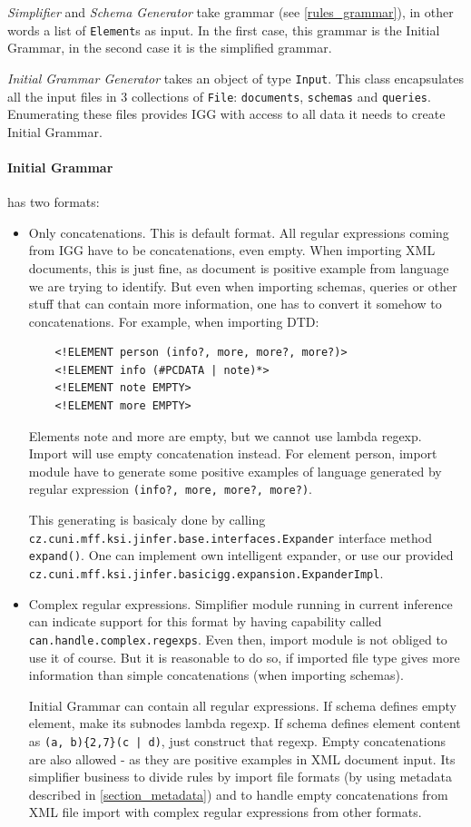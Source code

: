 \documentclass[a4paper,10pt,oneside]{article}
\newcommand{\code}[1]{\texttt{#1}}
\newcommand{\jmodule}[1]{\emph{#1}}
\begin{document}
\jmodule{Simplifier} and \jmodule{Schema Generator} take grammar (see \ref{rules_grammar}), in other words a list of \code{Element}s as input. In the first case, this grammar is the Initial Grammar, in the second case it is the simplified grammar.

\jmodule{Initial Grammar Generator} takes an object of type \code{Input}. This class encapsulates all the input files in 3 collections of \code{File}: \code{documents}, \code{schemas} and \code{queries}. Enumerating these files provides IGG with access to all data it needs to create Initial Grammar.

\paragraph{Initial Grammar} has two formats:
\begin{itemize}
	\item Only concatenations. This is default format. All regular expressions coming from IGG have to be concatenations, even empty.
	When importing XML documents, this is just fine, as document is positive example from language we are trying to identify.
	But even when importing schemas, queries or other stuff that can contain more information, one has to convert it somehow to concatenations.
	For example, when importing DTD:
	\begin{verbatim}
	<!ELEMENT person (info?, more, more?, more?)>
	<!ELEMENT info (#PCDATA | note)*>
	<!ELEMENT note EMPTY>
	<!ELEMENT more EMPTY>
	\end{verbatim}
	Elements note and more are empty, but we cannot use lambda regexp. Import will use empty concatenation instead.
	For element person, import module have to generate some positive examples of language generated by regular expression \verb+(info?, more, more?, more?)+.
	
	This generating is basicaly done by calling \code{cz.cuni.mff.ksi.jinfer.base.interfaces.Expander} interface method \code{expand()}. One can implement own intelligent expander, or use our provided\\ \code{cz.cuni.mff.ksi.jinfer.basicigg.expansion.ExpanderImpl}.
	
	\item Complex regular expressions. Simplifier module running in current inference can indicate support for this format by having capability called \code{can.handle.complex.regexps}.
	Even then, import module is not obliged to use it of course. But it is reasonable to do so, if imported file type gives more information than simple concatenations (when importing schemas).
	
	Initial Grammar can contain all regular expressions. If schema defines empty element, make its subnodes lambda regexp. If schema defines element content as \verb.(a, b){2,7}(c | d)., just construct that regexp. Empty concatenations are also allowed - as they are positive examples in XML document input. Its simplifier business to divide rules by import file formats (by using metadata described in \ref{section_metadata}) and to handle empty concatenations from XML file import with complex regular expressions from other formats.
\end{itemize}
\end{document}

